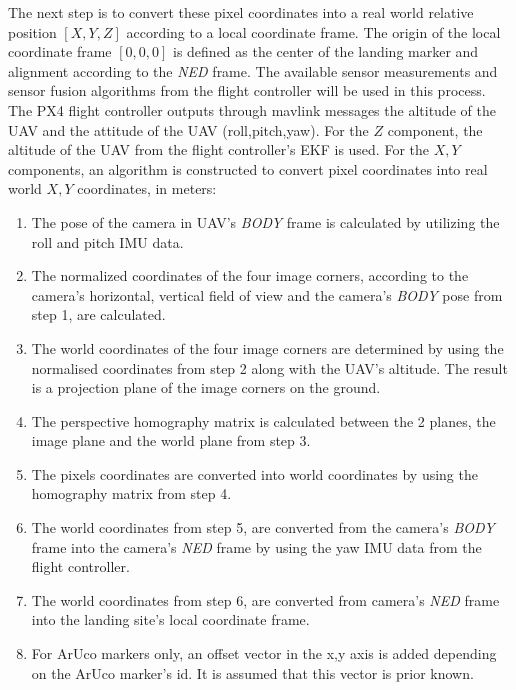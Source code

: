 \documentclass[conference]{IEEEtran}
\begin{document}
The next step is to convert these pixel coordinates into a real world relative position $[X,Y,Z]$ according to a local coordinate frame. The origin of the local coordinate frame $[0,0,0]$ is defined as the center of the landing marker and alignment according to the \emph{NED} frame. %
%
The available sensor measurements and sensor fusion algorithms from the flight controller will be used in this process. The PX4 flight controller outputs through mavlink messages the altitude of the UAV and the attitude of the UAV (roll,pitch,yaw). For the $Z$ component, the altitude of the UAV from the flight controller's EKF is used. For the $X,Y$ components, an algorithm is constructed to convert pixel coordinates into real world $X,Y$ coordinates, in meters: %

\begin{enumerate}

\item The pose of the camera in UAV's \emph{BODY} frame is calculated by utilizing the roll and pitch IMU data.

\item The normalized coordinates of the four image corners, according to the camera's horizontal, vertical field of view and the camera's \emph{BODY} pose from step 1, are calculated.

\item The world coordinates of the four image corners are determined by using the normalised coordinates from step 2 along with the UAV's altitude. The result is a projection plane of the image corners on the ground.

\item The perspective homography matrix is calculated between the 2 planes, the image plane and the world plane from step 3.

\item The pixels coordinates are converted into world coordinates by using the homography matrix from step 4.

\item The world coordinates from step 5, are converted from the camera's \emph{BODY} frame into the camera's \emph{NED} frame by using the yaw IMU data from the flight controller.

\item The world coordinates from step 6, are converted from camera's \emph{NED} frame into the landing site's local coordinate frame.

\item For ArUco markers only, an offset vector in the x,y axis is added depending on the ArUco marker's id. It is assumed that this vector is prior known.

\end{enumerate}
\end{document}

